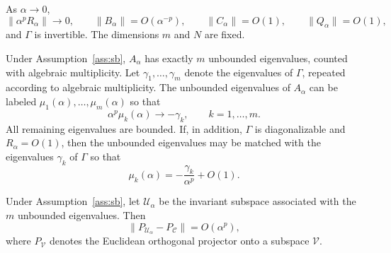 \documentclass[10pt,a4paper]{amsart}
\begin{document}
\begin{assumption}
\label{ass:sb}
As $\alpha\to0$,
\[
    \|\alpha^pR_\alpha\|\to0,\qquad
    \|B_\alpha\|=O(\alpha^{-p}),\qquad
    \|C_\alpha\|=O(1),\qquad
    \|Q_\alpha\|=O(1),
\]
and $\Gamma$ is invertible.  The dimensions $m$ and $N$ are fixed.
\end{assumption}

\begin{theorem}
\label{thm:singular}
Under Assumption~\ref{ass:sb}, $A_\alpha$ has exactly $m$ unbounded
eigenvalues, counted with algebraic multiplicity.  Let
$\gamma_1,\ldots,\gamma_m$ denote the eigenvalues of $\Gamma$, repeated
according to algebraic multiplicity.  The unbounded eigenvalues of $A_\alpha$
can be labeled $\mu_1(\alpha),\ldots,\mu_m(\alpha)$ so that
\begin{equation}
    \alpha^p\mu_k(\alpha)\longrightarrow-\gamma_k,
    \qquad k=1,\ldots,m.
    \label{eq:scaled-spectrum}
\end{equation}
All remaining eigenvalues are bounded.  If, in addition, $\Gamma$ is
diagonalizable and $R_\alpha=O(1)$, then the unbounded eigenvalues may be
matched with the eigenvalues $\gamma_k$ of $\Gamma$ so that
\begin{equation}
    \mu_k(\alpha)
    =
    -\frac{\gamma_k}{\alpha^p}+O(1).
    \label{eq:large-O1}
\end{equation}
\end{theorem}

\begin{theorem}
\label{thm:proj}
Under Assumption~\ref{ass:sb}, let $\mathcal U_\alpha$ be the invariant subspace
associated with the $m$ unbounded eigenvalues.  Then
\begin{equation}
    \|P_{\mathcal U_\alpha}-P_{\mathcal C}\|=O(\alpha^p),
    \label{eq:proj}
\end{equation}
where $P_{\mathcal V}$ denotes the Euclidean orthogonal projector onto a
subspace $\mathcal V$.
\end{theorem}
\end{document}
